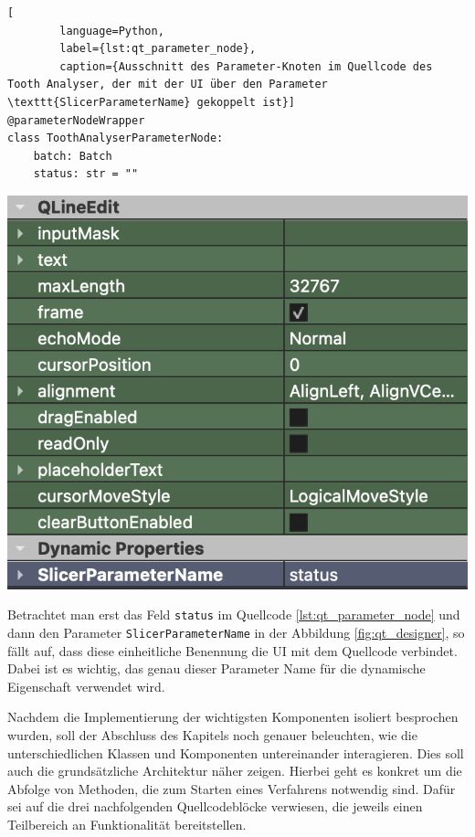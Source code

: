 \begin{minipage}{0.55\textwidth}
	\centering
	\begin{lstlisting}[
		language=Python,
		label={lst:qt_parameter_node},
		caption={Ausschnitt des Parameter-Knoten im Quellcode des Tooth Analyser, der mit der UI über den Parameter \texttt{SlicerParameterName} gekoppelt ist}]
@parameterNodeWrapper
class ToothAnalyserParameterNode:
    batch: Batch
    status: str = ""
    \end{lstlisting}
\end{minipage}
\hfill
\begin{minipage}{0.35\textwidth}
	\centering
	\includegraphics[width=\textwidth]{img/qt_designer.png}
	 \label{fig:qt_designer}
\end{minipage}

Betrachtet man erst das Feld \texttt{status} im Quellcode \ref{lst:qt_parameter_node}
und dann den Parameter \texttt{SlicerParameterName} in der Abbildung
\ref{fig:qt_designer}, so fällt auf, dass diese einheitliche Benennung die \ac{UI}
mit dem Quellcode verbindet. Dabei ist es wichtig, das genau dieser Parameter Name
für die dynamische Eigenschaft verwendet wird.

Nachdem die Implementierung der wichtigsten Komponenten isoliert besprochen wurden,
soll der Abschluss des Kapitels noch genauer beleuchten, wie die unterschiedlichen
Klassen und Komponenten untereinander interagieren. Dies soll auch die
grundsätzliche Architektur näher zeigen. Hierbei geht es konkret um die Abfolge von
Methoden, die zum Starten eines Verfahrens notwendig sind. Dafür sei auf die drei
nachfolgenden Quellcodeblöcke verwiesen, die jeweils einen Teilbereich an
Funktionalität bereitstellen.

